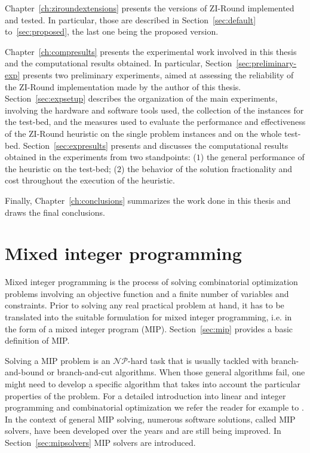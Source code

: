 \documentclass[a4paper,12pt,twoside]{scrbook}
\begin{document}
Chapter~\ref{ch:ziroundextensions} presents the versions of ZI-Round implemented and tested. In particular, those are described in Section~\ref{sec:default} to~\ref{sec:proposed}, the last one being the proposed version. \par 
Chapter~\ref{ch:compresults} presents the experimental work involved in this thesis and the computational results obtained. In particular, Section~\ref{sec:preliminary-exp} presents two preliminary experiments, aimed at assessing the reliability of the ZI-Round implementation made by the author of this thesis. Section~\ref{sec:expsetup} describes the organization of the main experiments, involving the hardware and software tools used, the collection of the instances for the test-bed, and the measures used to evaluate the performance and effectiveness of the ZI-Round heuristic on the single problem instances and on the whole test-bed. Section~\ref{sec:expresults} presents and discusses the computational results obtained in the experiments from two standpoints: ($1$) the general performance of the heuristic on the test-bed; ($2$) the behavior of the solution fractionality and cost throughout the execution of the heuristic. \par 
Finally, Chapter~\ref{ch:conclusions} summarizes the work done in this thesis and draws the final conclusions.

\chapter{Mixed integer programming} \label{ch:mips}
Mixed integer programming is the process of solving combinatorial optimization problems involving an objective function and a finite number of variables and constraints. Prior to solving any real practical problem at hand, it has to be translated into the suitable formulation for mixed integer programming, i.e. in the form of a mixed integer program (MIP). Section~\ref{sec:mip} provides a basic definition of MIP. \par 
Solving a MIP problem is an $\mathcal{NP}$-hard task that is usually tackled with branch-and-bound or branch-and-cut algorithms.
When those general algorithms fail, one might need to develop a specific algorithm that takes into account the particular properties of the problem.
For a detailed introduction into linear and integer programming and combinatorial optimization we refer the reader for example to \cite{fischetti2019}.
In the context of general MIP solving, numerous software solutions, called MIP solvers, have been developed over the years and are still being improved. In Section~\ref{sec:mipsolvers} MIP solvers are introduced.
\end{document}

